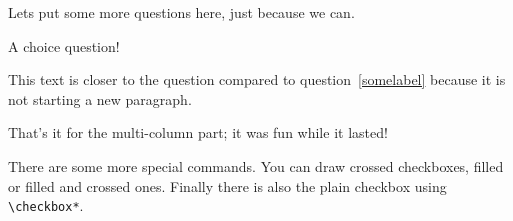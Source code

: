 \documentclass[
  english,
  pagemark,
  stamp]{sdaps}
\begin{document}
\begin{questionnaire}
\begin{multicols}{2}
      Lets put some more questions here, just because we can.

      \begin{choicequestion}[1]{A choice question!}
      \end{choicequestion}

      This text is closer to the question compared to question~\ref{somelabel}
      because it is not starting a new paragraph.


    \end{multicols}

    That's it for the multi-column part; it was fun while it lasted!

    There are some more special commands. You can draw \checkedbox{} crossed
    checkboxes, \filledbox{} filled or \correctedbox{} filled and crossed ones. Finally there is
    also the plain \checkbox*{} checkbox using {\tt \textbackslash{}checkbox*}.


    \def\checkboxstyle{box}

  \end{questionnaire}
\end{document}
